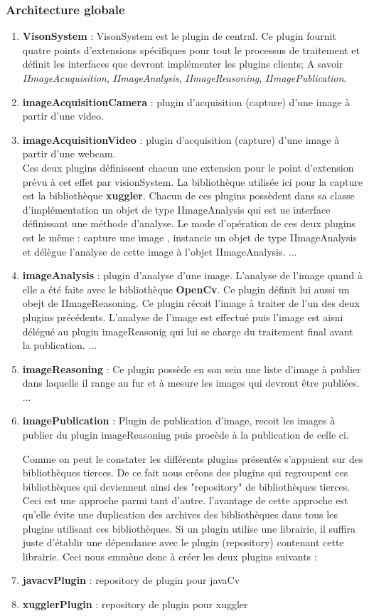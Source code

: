 \documentclass[a4paper , 12pt]{article}
\begin{document}
\subsubsection{Architecture globale}
\begin{enumerate}
	\item {\bf VisonSystem} : VisonSystem est le plugin de central. Ce plugin fournit quatre points d'extensions spécifiques pour tout le processus de traitement et définit les interfaces que devront implémenter les plugins clients; A savoir {\it IImageAcuquisition}, {\it IImageAnalysis}, {\it IImageReasoning}, {\it IImagePublication}.
	\item {\bf imageAcquisitionCamera} : plugin d'acquisition (capture) d'une image à partir d'une video. 
	\item {\bf imageAcquisitionVideo} :  plugin d'acquisition (capture) d'une image à partir d'une webcam. \\
Ces deux plugins définissent chacun une extension pour le point d'extension prévu à cet effet par visionSystem. La bibliothèque utilisée ici pour la capture est la bibliothèque {\bf xuggler}. Chacun de ces plugins possèdent dans sa classe d'implémentation un objet de type IImageAnalysis qui est ue interface définissant une méthode d'analyse. Le mode d'opération de ces deux plugins est le même : capture une image , instancie un objet de type IImageAnalysis et délègue l'analyse de cette image à l'objet IImageAnalysis.
...
	\item {\bf imageAnalysis} : plugin d'analyse d'une image. L'analyse de l'image quand à elle a été faite avec le bibliothèque {\bf OpenCv}. Ce plugin définit lui aussi un obejt de IImageReasoning. Ce plugin récoit l'image à traiter de l'un des deux plugins précédents. L'analyse de l'image est effectué puis l'image est aisni délégué au plugin imageReasonig qui lui se charge du traitement final avant la publication. 
...
	\item {\bf imageReasoning} : Ce plugin possède en son sein une liste d'image à publier dans laquelle il range au fur et à mesure les images qui devront être publiées. ...
	\item {\bf imagePublication} : Plugin de publication d'image, recoit les images à publier du plugin imageReasoning puis procède à la publication de celle ci.
	
Comme on peut le constater les différents plugins présentés s'appuient sur des bibliothèques tierces. De ce fait nous créons des plugins qui regroupent ces bibliothèques qui deviennent ainsi des "repository" de bibliothèques tierces. Ceci est une approche parmi tant d'autre. l'avantage de cette approche est qu'elle évite une duplication des archives des bibliothèques dans tous les plugins utilisant ces bibliothèques. Si un plugin utilise une librairie, il suffira juste d'établir une dépendance avec le plugin (repository) contenant cette librairie. Ceci nous emmène donc à créer les deux plugins suivants : 
	\item {\bf javacvPlugin} : repository de plugin pour javaCv  
	\item {\bf xugglerPlugin} : repository de plugin pour xuggler 

\end{enumerate}
\end{document}
